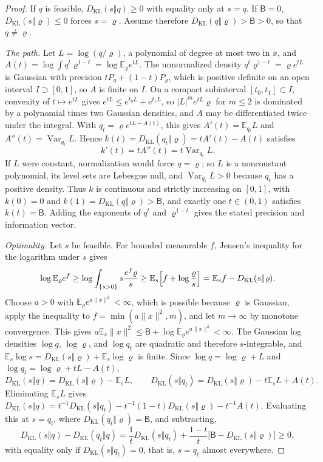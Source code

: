 \documentclass[11pt]{article}
\theoremstyle{definition}
\theoremstyle{remark}
\providecommand{\KL}{D_{\mathrm{KL}}}
\providecommand{\E}{\mathbb{E}}
\begin{document}
\begin{proof}
If $q$ is feasible, $\KL(s\Vert q)\ge0$ with equality only at $s=q$. If $\mathsf B=0$, $\KL(s\Vert\varrho)\le0$ forces $s=\varrho$. Assume therefore $\KL(q\Vert\varrho)>\mathsf B>0$, so that $q\ne\varrho$.

\emph{The path.} Let $L=\log(q/\varrho)$, a polynomial of degree at most two in $x$, and $A(t)=\log\int q^t\varrho^{1-t}=\log\E_\varrho e^{tL}$. The unnormalized density $q^t\varrho^{1-t}=\varrho e^{tL}$ is Gaussian with precision $tP_q+(1-t)P_\varrho$, which is positive definite on an open interval $I\supset[0,1]$, so $A$ is finite on $I$. On a compact subinterval $[t_0,t_1]\subset I$, convexity of $t\mapsto e^{tL}$ gives $e^{tL}\le e^{t_0L}+e^{t_1L}$, so $\lvert L\rvert^me^{tL}\varrho$ for $m\le2$ is dominated by a polynomial times two Gaussian densities, and $A$ may be differentiated twice under the integral. With $q_t=\varrho e^{tL-A(t)}$, this gives $A'(t)=\E_{q_t}L$ and $A''(t)=\operatorname{Var}_{q_t}L$. Hence $k(t)=\KL(q_t\Vert\varrho)=tA'(t)-A(t)$ satisfies
\[
k'(t)=tA''(t)=t\operatorname{Var}_{q_t}L.
\]
If $L$ were constant, normalization would force $q=\varrho$; so $L$ is a nonconstant polynomial, its level sets are Lebesgue null, and $\operatorname{Var}_{q_t}L>0$ because $q_t$ has a positive density. Thus $k$ is continuous and strictly increasing on $[0,1]$, with $k(0)=0$ and $k(1)=\KL(q\Vert\varrho)>\mathsf B$, and exactly one $t\in(0,1)$ satisfies $k(t)=\mathsf B$. Adding the exponents of $q^t$ and $\varrho^{1-t}$ gives the stated precision and information vector.

\emph{Optimality.} Let $s$ be feasible. For bounded measurable $f$, Jensen's inequality for the logarithm under $s$ gives
\[
\log\E_\varrho e^f\ge\log\int_{\{s>0\}}s\frac{e^f\varrho}{s}\ge\E_s\Bigl[f+\log\frac{\varrho}{s}\Bigr]=\E_sf-\KL(s\Vert\varrho).
\]
Choose $a>0$ with $\E_\varrho e^{a\lVert x\rVert^2}<\infty$, which is possible because $\varrho$ is Gaussian, apply the inequality to $f=\min(a\lVert x\rVert^2,m)$, and let $m\to\infty$ by monotone convergence. This gives $a\E_s\lVert x\rVert^2\le\mathsf B+\log\E_\varrho e^{a\lVert x\rVert^2}<\infty$. The Gaussian log densities $\log q$, $\log\varrho$, and $\log q_t$ are quadratic and therefore $s$-integrable, and $\E_s\log s=\KL(s\Vert\varrho)+\E_s\log\varrho$ is finite. Since $\log q=\log\varrho+L$ and $\log q_t=\log\varrho+tL-A(t)$,
\[
\KL(s\Vert q)=\KL(s\Vert\varrho)-\E_sL,\qquad \KL(s\Vert q_t)=\KL(s\Vert\varrho)-t\E_sL+A(t).
\]
Eliminating $\E_sL$ gives $\KL(s\Vert q)=t^{-1}\KL(s\Vert q_t)-t^{-1}(1-t)\KL(s\Vert\varrho)-t^{-1}A(t)$. Evaluating this at $s=q_t$, where $\KL(q_t\Vert\varrho)=\mathsf B$, and subtracting,
\[
\KL(s\Vert q)-\KL(q_t\Vert q)=\frac1t\KL(s\Vert q_t)+\frac{1-t}{t}\bigl[\mathsf B-\KL(s\Vert\varrho)\bigr]\ge0,
\]
with equality only if $\KL(s\Vert q_t)=0$, that is, $s=q_t$ almost everywhere.
\end{proof}
\end{document}
